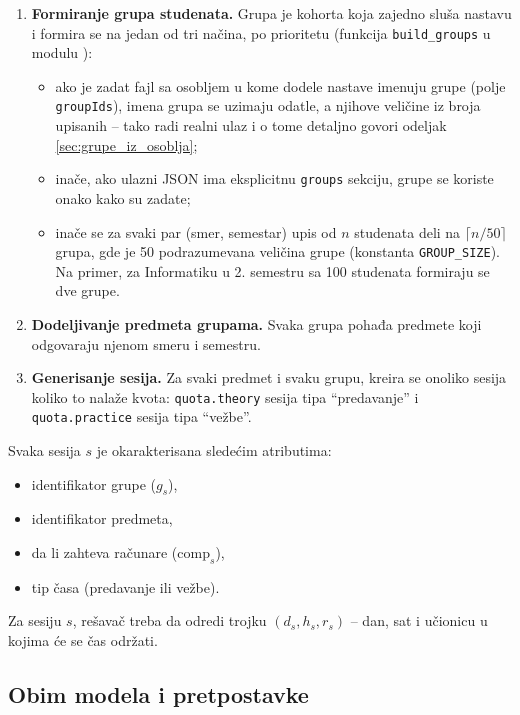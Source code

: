 \documentclass[12pt,oneside]{memoir}
\begin{document}
\begin{enumerate}
\item \textbf{Formiranje grupa studenata.}
  Grupa je kohorta koja zajedno sluša nastavu i formira se na jedan od
  tri načina, po prioritetu (funkcija \texttt{build\_groups} u modulu
  ):
  \begin{itemize}
  \item ako je zadat fajl sa osobljem u kome dodele nastave imenuju
    grupe (polje \texttt{groupIds}), imena grupa se uzimaju odatle, a
    njihove veličine iz broja upisanih -- tako radi realni ulaz i o tome
    detaljno govori odeljak \ref{sec:grupe_iz_osoblja};
  \item inače, ako ulazni JSON ima eksplicitnu \texttt{groups} sekciju,
    grupe se koriste onako kako su zadate;
  \item inače se za svaki par (smer, semestar) upis od $n$ studenata
    deli na $\lceil n / 50 \rceil$ grupa, gde je 50 podrazumevana
    veličina grupe (konstanta \texttt{GROUP\_SIZE}). Na primer, za
    Informatiku u 2. semestru sa 100 studenata formiraju se dve grupe.
  \end{itemize}

\item \textbf{Dodeljivanje predmeta grupama.}
  Svaka grupa pohađa predmete koji odgovaraju njenom smeru i
  semestru.

\item \textbf{Generisanje sesija.}
  Za svaki predmet i svaku grupu, kreira se onoliko sesija koliko
  to nalaže kvota: \texttt{quota.theory} sesija tipa ``predavanje''
  i \texttt{quota.practice} sesija tipa ``vežbe''.
\end{enumerate}

Svaka sesija $s$ je okarakterisana sledećim atributima:
\begin{itemize}
\item identifikator grupe ($g_s$),
\item identifikator predmeta,
\item da li zahteva računare ($\text{comp}_s$),
\item tip časa (predavanje ili vežbe).
\end{itemize}

Za sesiju $s$, rešavač treba da odredi trojku $(d_s, h_s, r_s)$
-- dan, sat i učionicu u kojima će se čas održati.

\subsection{Obim modela i pretpostavke}
\label{sec:obim_modela}
\end{document}

